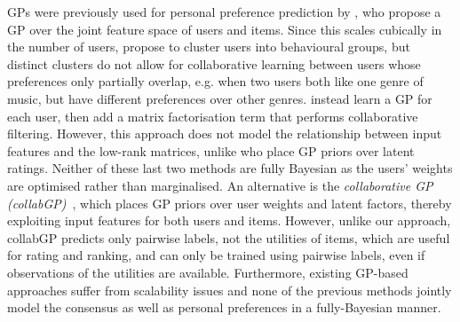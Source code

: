 
GPs were previously used 
for personal preference prediction
by \citet{guo2010gaussian}, who propose a GP over the joint feature 
space of users and items. Since this scales cubically
in the number of users, \citet{abbasnejad2013learning} 
propose to cluster users into behavioural groups,
but distinct clusters do not
allow for collaborative learning between users whose preferences only partially overlap, 
e.g. when two users both like one genre of music, 
but have different preferences over other genres. 
\citet{khan2014scalable} instead learn a GP for each user,
then add a matrix factorisation term that performs collaborative filtering.
However, this approach does not model the relationship between
 input features and the low-rank matrices,
 unlike \citet{lawrence2009non} who place GP priors over latent ratings.
 Neither of these last two methods
 are fully Bayesian as the users' weights
 are optimised rather than marginalised.
An alternative is the \emph{collaborative GP (collabGP)}~\citep{houlsby2012collaborative},
which places GP priors over user weights and latent factors,
thereby exploiting input features for both users and items. 
However, unlike our approach, collabGP predicts only pairwise labels, not 
the utilities of items, which are useful for rating and ranking,
and can only be trained using pairwise labels, even if observations of the utilities
are available.
Furthermore, existing GP-based approaches
suffer from scalability issues and 
none of the previous methods jointly model the consensus as well as personal preferences
in a fully-Bayesian manner.

